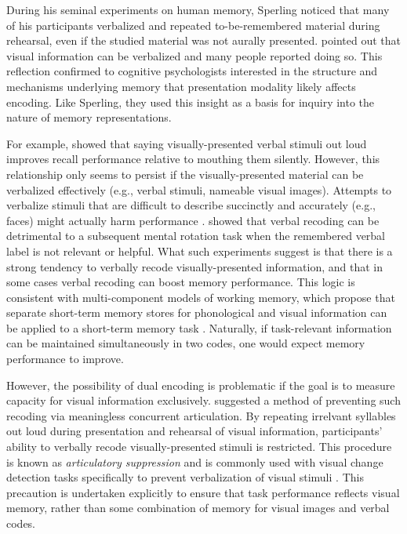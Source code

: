 
During his seminal experiments on human memory, Sperling noticed that many of his participants verbalized and repeated to-be-remembered material during rehearsal, even if the studied material was not aurally presented. \citet{Sperling:1967} pointed out that visual information can be verbalized and many people reported doing so. This reflection confirmed to cognitive psychologists interested in the structure and mechanisms underlying memory that presentation modality likely affects encoding. Like Sperling, they used this insight as a basis for inquiry into the nature of memory representations.

For example, \citet{Murray:1965} showed that saying visually-presented verbal stimuli out loud improves recall performance relative to mouthing them silently. However, this relationship only seems to persist if the visually-presented material can be verbalized effectively (e.g., verbal stimuli, nameable visual images). Attempts to verbalize stimuli that are difficult to describe succinctly and accurately (e.g., faces) might actually harm performance \citep{Schooler:Engstler-Schooler:1990}. \citet{Brandimonte:etal:1992} showed that verbal recoding can be detrimental to a subsequent mental rotation task when the remembered verbal label is not relevant or helpful. What such experiments suggest is that there is a strong tendency to verbally recode visually-presented information, and that in some cases verbal recoding can boost memory performance. This logic is consistent with multi-component models of working memory, which propose that separate short-term memory stores for phonological and visual information can be applied to a short-term memory task \citep{Baddeley:1986}. Naturally, if task-relevant information can be maintained simultaneously in two codes, one would expect memory performance to improve. 

However, the possibility of dual encoding is problematic if the goal is to measure capacity for visual information exclusively. \citet{Levy:1971} suggested a method of preventing such recoding via meaningless concurrent articulation. By repeating irrelvant syllables out loud during presentation and rehearsal of visual information, participants' ability to verbally recode visually-presented stimuli is restricted. This procedure is known as \emph{articulatory suppression} and is commonly used with visual change detection tasks specifically to prevent verbalization of visual stimuli \citep[e.g.][]{Allen:etal:2006, Brockmole:etal:2008, Delvenne:Bruyer:2004, Hollingworth:Rasmussen:2010, Logie:etal:2009, Makovski:Jiang:2008, Makovski:etal:2008, Matsukura:Hollingworth:2011, Treisman:Zhang:2006, vanLamsweerde:Beck:2012, Woodman:Vogel:2005, Woodman:Vogel:2008}. This precaution is undertaken explicitly to ensure that task performance reflects visual memory, rather than some combination of memory for visual images and verbal codes. 

